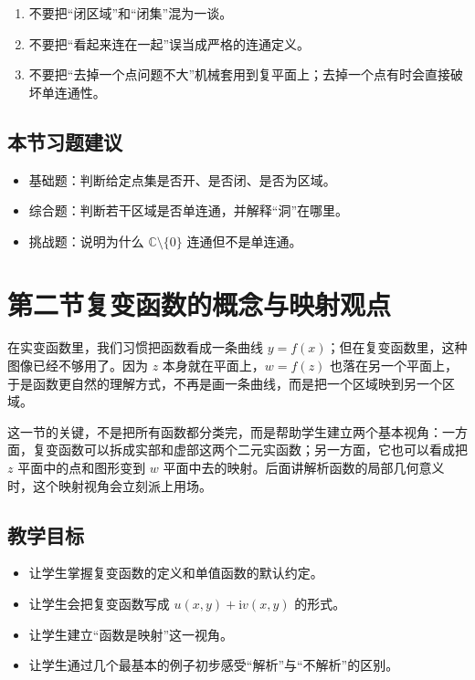 \begin{jinshi}[本节易错点]
\begin{enumerate}
    \item 不要把``闭区域''和``闭集''混为一谈。
    \item 不要把``看起来连在一起''误当成严格的连通定义。
    \item 不要把``去掉一个点问题不大''机械套用到复平面上；去掉一个点有时会直接破坏单连通性。
\end{enumerate}
\end{jinshi}

\subsection*{本节习题建议}
\begin{itemize}
    \item 基础题：判断给定点集是否开、是否闭、是否为区域。
    \item 综合题：判断若干区域是否单连通，并解释``洞''在哪里。
    \item 挑战题：说明为什么 $\mathbb{C}\setminus\{0\}$ 连通但不是单连通。
\end{itemize}

\section{第二节\quad 复变函数的概念与映射观点}

\begin{wulibj}[本节要解决的问题]
在实变函数里，我们习惯把函数看成一条曲线 $y=f(x)$；但在复变函数里，这种图像已经不够用了。因为 $z$ 本身就在平面上，$w=f(z)$ 也落在另一个平面上，于是函数更自然的理解方式，不再是画一条曲线，而是把一个区域映到另一个区域。

这一节的关键，不是把所有函数都分类完，而是帮助学生建立两个基本视角：一方面，复变函数可以拆成实部和虚部这两个二元实函数；另一方面，它也可以看成把 $z$ 平面中的点和图形变到 $w$ 平面中去的映射。后面讲解析函数的局部几何意义时，这个映射视角会立刻派上用场。
\end{wulibj}

\subsection*{教学目标}
\begin{itemize}
    \item 让学生掌握复变函数的定义和单值函数的默认约定。
    \item 让学生会把复变函数写成 $u(x,y)+\mathrm{i}v(x,y)$ 的形式。
    \item 让学生建立``函数是映射''这一视角。
    \item 让学生通过几个最基本的例子初步感受``解析''与``不解析''的区别。
\end{itemize}

